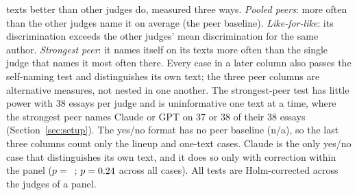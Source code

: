 \begin{table}[t]
{texts better than other judges do, measured three ways. \emph{Pooled peers}:
more often than the other judges name it on average (the peer baseline).
\emph{Like-for-like}: its discrimination exceeds the other judges' mean
discrimination for the same author. \emph{Strongest peer}: it names itself on
its texts more often than the single judge that names it most often there.
Every case in a later column also passes the self-naming test and
distinguishes its own text; the three peer columns are alternative measures,
not nested in one another. The strongest-peer test has little power with 38
essays per judge and is uninformative one text at a time, where the strongest
peer names Claude or GPT on 37 or 38 of their 38 essays (Section~\ref{sec:setup}).
The yes/no format has no peer baseline (n/a), so the last three columns count
only the \CVattr{} lineup and one-text cases. Claude is the only yes/no case that distinguishes its own text, and it
does so only with correction within the panel ($p=$~\FBClaudeHolm{};
$p=0.24$ across all \CVcells{} cases). All tests are
Holm-corrected across the judges of a panel.}
\label{tab:verdicts}
\end{table}
